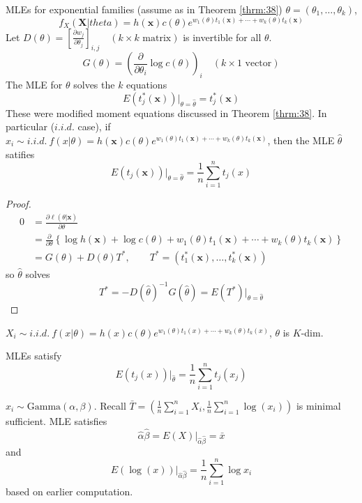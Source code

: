 \documentclass[english, 11pt]{article}
\begin{document}
\begin{thrm}\label{thrm:320}
MLEs for exponential families (assume as in Theorem \ref{thrm:38}) $\theta=(\theta_1, \dots, \theta_k)$,
$$
f_X(\bm{X}|theta)=h(\bm{x})c(\theta)e^{w_1(\theta)t_1(\bm{x})+\cdots+w_k(\theta)t_k(\bm{x})}
$$
Let $D(\theta)=\left[\frac{\partial w_j}{\partial \theta_j}\right]_{i, j}\quad(k\times k\text{ matrix})$ is invertible for all $\theta$.
$$
G(\theta)=\left(\frac{\partial}{\partial \theta_i}\log c(\theta)\right)_i\quad(k\times 1\text{ vector})
$$
The MLE for $\theta$ solves the $k$ equations
$$
E(t_j^*(\bm{x}))|_{\theta=\hat{\theta}}=t_j^*(\bm{x})
$$
These were modified moment equations discussed in Theorem \ref{thrm:38}. In particular ($i.i.d.$ case), if $x_i\sim i.i.d.~f(x|\theta)=h(\bm{x})c(\theta)e^{w_1(\theta)t_1(\bm{x})+\cdots+w_k(\theta)t_k(\bm{x})}$, then the MLE $\hat{\theta}$ satifies
$$
E(t_j(\bm{x}))|_{\theta=\hat{\theta}}=\frac{1}{n}\sum_{i=1}^nt_j(x)
$$
\end{thrm}
\begin{proof}
$$
\begin{aligned}
0&=\frac{\partial\ell(\theta|\bm{x})}{\partial \theta}\\
&=\frac{\partial}{\partial \theta}\left\{\log h(\bm{x})+\log c(\theta)+w_1(\theta)t_1(\bm{x})+\cdots+w_k(\theta)t_k(\bm{x})\right\}\\
&=G(\theta)+D(\theta)T^*, \qquad T^*=(t_1^*(\bm{x}), \dots, t_k^*(\bm{x}))
\end{aligned}
$$
so $\hat{\theta}$ solves
$$
T^*=-D(\hat{\theta})^{-1}G(\hat{\theta})=E(T^*)|_{\theta=\hat{\theta}}
$$
\end{proof}

$X_i\sim i.i.d.~f(x|\theta)=h(x)c(\theta)e^{w_1(\theta)t_1(x)+\cdots+w_k(\theta)t_k(x)}$, $\theta$ is $K$-dim.

MLEs satisfy
$$
E(t_j(x))|_{\hat{\theta}}=\frac{1}{n}\sum_{i=1}^nt_j(x_j)
$$

\begin{exmp}
$x_i\sim \text{Gamma}(\alpha, \beta)$. Recall $\bar{T}=\left(\frac{1}{n}\sum_{i=1}^n X_i, \frac{1}{n}\sum_{i=1}^n\log(x_i)\right)$ is minimal sufficient. MLE satisfies
$$
\hat{\alpha}\hat{\beta}=E(X)|_{\hat{\alpha}\hat{\beta}}=\bar{x}
$$
and
$$
E(\log(x))|_{\hat{\alpha}\hat{\beta}}=\frac{1}{n}\sum_{i=1}^n\log x_i
$$
based on earlier computation.
\end{exmp}
\end{document}
